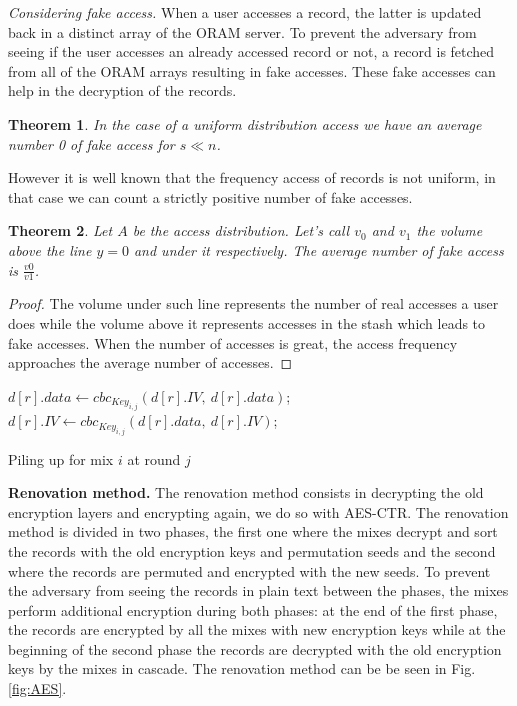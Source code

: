 \documentclass[USenglish,oneside,twocolumn]{article}
\newtheorem{theorem}{Theorem}
\begin{document}
\noindent\textit{Considering fake access.} When a user accesses a record, the latter is updated back in a distinct array of the ORAM server. To prevent the adversary from seeing if the user accesses an already accessed record or not, a record is fetched from all of the ORAM arrays resulting in fake accesses. These fake accesses can help in the decryption of the records. 
%
\begin{theorem}
In the case of a uniform distribution access we have an average number 0 of fake access for $s\ll n$.
\end{theorem}
%
However it is well known that the frequency access of records is not uniform, in that case we can count a strictly positive number of fake accesses.
\begin{theorem}
Let $A$ be the access distribution. Let's call $v_0$ and $v_1$ the volume above the line $y=0$ and under it respectively.
The average number of fake access is $ \frac{v0}{v1}$.
\end{theorem}
\begin{proof}
The volume under such line represents the number of real accesses a user does while the volume above it represents accesses in the stash which leads to fake accesses.
When the number of accesses is great, the access frequency approaches the average number of accesses.
\end{proof}

\begin{algorithm}
\DontPrintSemicolon
{}
{
	$d[r].data \gets cbc_{Key_{i,j}}\left( d[r].IV,\ d[r].data \right )$;\\
	$d[r].IV \gets cbc_{Key_{i,j}}\left( d[r].data,\ d[r].IV \right )$;\\
}
\caption{Piling up for mix $i$ at round $j$}
\label{alg:pile}
\end{algorithm}

\noindent\textbf{Renovation method.} The renovation method consists in decrypting the old encryption layers and encrypting again, we do so with AES-CTR. 
The renovation method is divided in two phases, the first one where the mixes decrypt and sort the records with the old encryption keys and permutation seeds and the second where the records are permuted and encrypted with the new seeds.
To prevent the adversary from seeing the records in plain text between the phases, the mixes perform additional encryption during both phases: at the end of the first phase, the records are encrypted by all the mixes with new encryption keys while at the beginning of the second phase the records are decrypted with the old encryption keys by the mixes in cascade.
The renovation method can be be seen in Fig.\ref{fig:AES}.  
\end{document}
